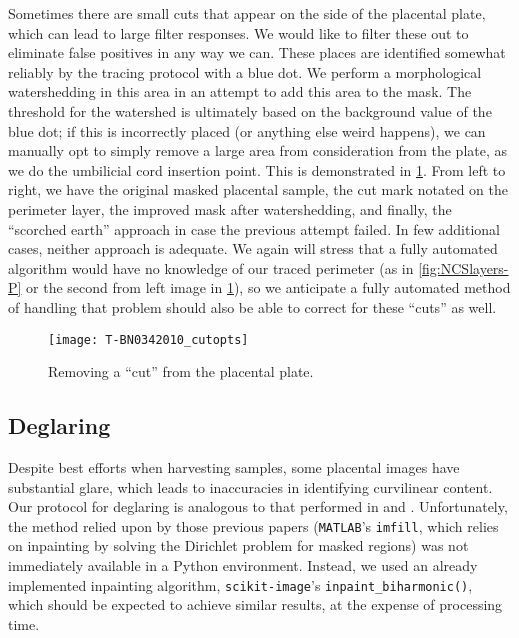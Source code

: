     Sometimes there are small cuts that appear on the side of the placental plate, which can lead to large filter responses. We would like to filter these out to eliminate false positives in any way we can. These places are identified somewhat reliably by the tracing protocol with a blue dot. We perform a morphological watershedding in this area in an attempt to add this area to the mask.
    The threshold for the watershed is ultimately based on the background value of the blue dot; if this is incorrectly placed (or anything else weird happens), we can manually opt to simply remove a large area from consideration from the plate, as we do the umbilicial cord insertion point. This is demonstrated in \cref{fig:cutdemo}. From left to right, we have the original masked placental sample, the cut mark notated on the perimeter layer, the improved mask after watershedding, and finally, the ``scorched earth'' approach in case the previous attempt failed. In few additional cases, neither approach is adequate. We again will stress that a fully automated algorithm would have no knowledge of our traced perimeter (as in \cref{fig:NCSlayers-P} or the second from left image in \cref{fig:cutdemo}), so we anticipate a fully automated method of handling that problem should also be able to correct for these ``cuts'' as well.
    
    \begin{figure}
        \centering
        \texttt{[image: T-BN0342010\_cutopts]}
        \caption{Removing a ``cut'' from the placental plate.}
        \label{fig:cutdemo}
    \end{figure}
    \subsection{Deglaring}
    
    Despite best efforts when harvesting samples, some placental images have substantial glare, which leads to inaccuracies in identifying curvilinear content. Our protocol for deglaring is analogous to that performed in \cite{almoussa-ucla-reu} and \cite{huynh2013filter}. Unfortunately, the method relied upon by those previous papers (\texttt{MATLAB}'s \texttt{imfill}, which relies on inpainting by solving the Dirichlet problem for masked regions) was not immediately available in a Python environment. Instead, we used an already implemented inpainting algorithm, \texttt{scikit-image}'s \texttt{inpaint\_biharmonic()}, which should be expected to achieve similar results, at the expense of processing time.
    
